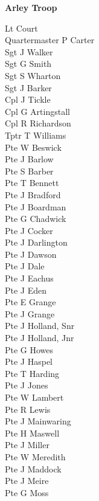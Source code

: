 \begin{center}
  \Large
  \textbf{Arley Troop}
\end{center}

\begin{multicols}{2}
  \noindent
  Lt Court \\
  Quartermaster P Carter \\
  Sgt J Walker \\
  Sgt G Smith \\
  Sgt S Wharton \\
  Sgt J Barker \\
  Cpl J Tickle \\
  Cpl G Artingstall \\
  Cpl R Richardson \\
  Tptr T Williams \\
  Pte W Beswick \\
  Pte J Barlow \\
  Pte S Barber \\
  Pte T Bennett \\
  Pte J Bradford \\
  Pte J Boardman \\
  Pte G Chadwick \\
  Pte J Cocker \\
  Pte J Darlington \\
  Pte J Dawson \\
  Pte J Dale \\
  Pte J Eachus \\
  Pte J Eden \\
  Pte E Grange \\
  Pte J Grange \\
  Pte J Holland, Snr \\
  Pte J Holland, Jnr \\
  Pte G Howes \\
  Pte J Haspel \\
  Pte T Harding \\
  Pte J Jones \\
  Pte W Lambert \\
  Pte R Lewis \\
  Pte J Mainwaring \\
  Pte H Maswell \\
  Pte J Miller \\
  Pte W Meredith \\
  Pte J Maddock \\
  Pte J Meire \\
  Pte G Moss \\

\end{multicols}
